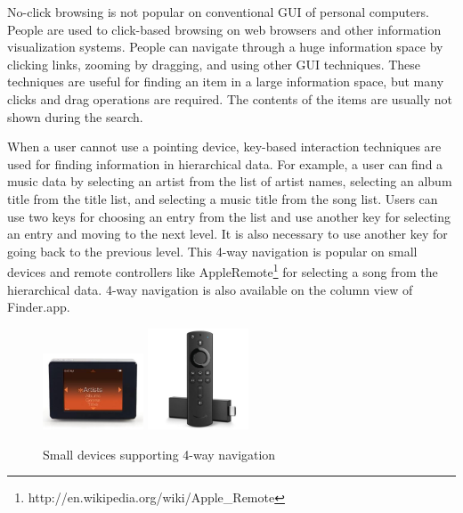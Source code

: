 \documentclass{article}
\begin{document}
No-click browsing is not popular on conventional GUI of personal computers.
People are used to click-based browsing on web browsers and other
information visualization systems.
People can navigate through a huge information space by
clicking links, zooming by dragging, and using other GUI techniques.
These techniques are useful for finding an item in a large information space,
but many clicks and drag operations are required.
The contents of the items are usually not shown during the search.

% 



When a user cannot use a pointing device,
key-based interaction techniques are used for
finding information in hierarchical data.
%
For example, a user can find a music data by
selecting an artist from the list of artist names,
selecting an album title from the title list,
and selecting a music title from the song list.
%
Users can use two keys for choosing an entry from the list
and use another key for selecting an entry and moving to the next level.
It is also necessary to use another key for going back to the previous level.
This 4-way navigation is popular on small devices
and remote controllers like AppleRemote\footnote{\textsf{http://en.wikipedia.org/wiki/Apple\_Remote}}
for selecting a song from the hierarchical data.
4-way navigation is also available on the column view of Finder.app.

\begin{figure}[H]
\centerline{
  \includegraphics[width=30mm,bb=0 0 333 250]{figures/0048a5e91ddcf1d5670bd958e3c55619.jpg}
  \includegraphics[width=30mm,bb=0 0 551 551]{figures/70c036b24525c6cace9955b24152e97e.jpg}
  }
\caption{Small devices supporting 4-way navigation}
\label{rio}
\end{figure}
\end{document}
